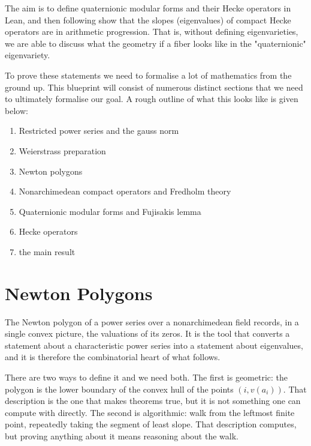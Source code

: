 The aim is to define quaternionic modular forms and their Hecke operators in Lean, and then following
\cite{Jacobs} show that the slopes (eigenvalues) of compact Hecke operators are in arithmetic
progression. That is, without defining eigenvarieties, we are able to discuss what the geometry
if a fiber looks like in the "quaternionic" eigenvariety.


To prove these statements we need to formalise a lot of mathematics from the ground up. This blueprint
will consist of numerous distinct sections that we need to ultimately formalise our goal. A rough
outline of what this looks like is given below:


\begin{enumerate}
  \item Restricted power series and the gauss norm
  \item Weierstrass preparation
  \item Newton polygons
  \item Nonarchimedean compact operators and Fredholm theory
  \item Quaternionic modular forms and Fujisakis lemma
  \item Hecke operators
  \item the main result
\end{enumerate}


\chapter{Newton Polygons}
\label{chap:np}

The Newton polygon of a power series over a nonarchimedean field records, in a single convex
picture, the valuations of its zeros.  It is the tool that converts a statement about a
characteristic power series into a statement about eigenvalues, and it is therefore the
combinatorial heart of what follows.

There are two ways to define it and we need both.  The first is geometric: the polygon is the
lower boundary of the convex hull of the points $(i, v(a_i))$.  That description is the one that
makes theorems true, but it is not something one can compute with directly.  The second is
algorithmic: walk from the leftmost finite point, repeatedly taking the segment of least slope.
That description computes, but proving anything about it means reasoning about the walk.

